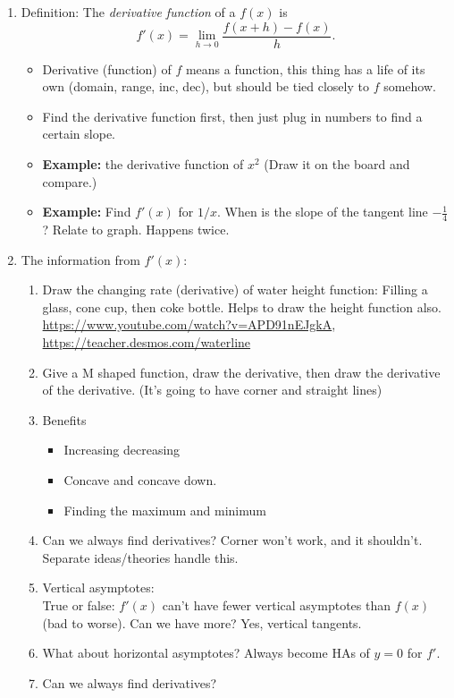 \documentclass{article}
\begin{document}
\begin{enumerate}
\item Definition: The \emph{derivative function} of a $f(x)$ is
$$
f'(x) = \lim_{h\rightarrow 0}\frac{f(x+h)-f(x)}{h}.
$$
\begin{itemize}
\item Derivative (function) of $f$ means a function, this thing has a life of its own (domain, range, inc, dec), but should be tied closely to $f$ somehow.
\item Find the derivative function first, then just plug in numbers to find a certain slope.
\item {\bf Example:} the derivative function of $x^2$ (Draw it on the board and compare.)
\item {\bf Example:} Find $f'(x)$ for $1/x$. When is the slope of the tangent line $-\frac{1}{4}$? Relate to graph. Happens twice.
\end{itemize}

\item The information from $f'(x)$:
\begin{enumerate}
\item Draw the changing rate (derivative) of water height function: Filling a glass, cone cup, then coke bottle. Helps to draw the height function also. \url{https://www.youtube.com/watch?v=APD91nEJgkA}, 
\url{https://teacher.desmos.com/waterline}
\item Give a M shaped function, draw the derivative, then draw the derivative of the derivative. (It's going to have corner and straight lines)
\item Benefits
\begin{itemize}
\item Increasing decreasing
\item Concave and concave down.
\item Finding the maximum and minimum
\end{itemize}
\item Can we always find derivatives? Corner won't work, and it shouldn't. Separate ideas/theories handle this.
\item Vertical asymptotes: \\
True or false: $f'(x)$ can't have fewer vertical asymptotes than $f(x)$ (bad to worse). Can we have more? Yes, vertical tangents.
\item What about horizontal asymptotes? Always become HAs of $y=0$ for $f'$. 
\item Can we always find derivatives?
\end{enumerate} 


\end{enumerate}
\end{document}
